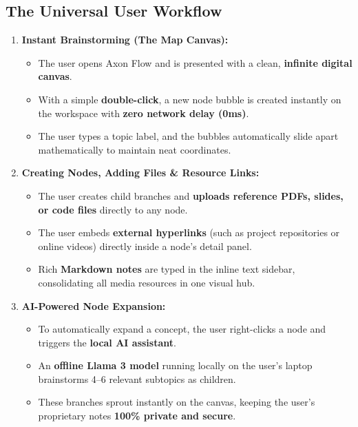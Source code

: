 \documentclass[12pt, a4paper]{article}
\begin{document}
\subsection{The Universal User Workflow}
\begin{enumerate}[leftmargin=*, label=\textbf{\alph*)}]
  \item \textbf{Instant Brainstorming (The Map Canvas):}
    \begin{itemize}[label=\small$\bullet$, leftmargin=15pt]
      \item The user opens Axon Flow and is presented with a clean, \textbf{infinite digital canvas}.
      \item With a simple \textbf{double-click}, a new node bubble is created instantly on the workspace with \textbf{zero network delay (0ms)}.
      \item The user types a topic label, and the bubbles automatically slide apart mathematically to maintain neat coordinates.
    \end{itemize}
    
  \item \textbf{Creating Nodes, Adding Files \& Resource Links:}
    \begin{itemize}[label=\small$\bullet$, leftmargin=15pt]
      \item The user creates child branches and \textbf{uploads reference PDFs, slides, or code files} directly to any node.
      \item The user embeds \textbf{external hyperlinks} (such as project repositories or online videos) directly inside a node's detail panel.
      \item Rich \textbf{Markdown notes} are typed in the inline text sidebar, consolidating all media resources in one visual hub.
    \end{itemize}

  \item \textbf{AI-Powered Node Expansion:}
    \begin{itemize}[label=\small$\bullet$, leftmargin=15pt]
      \item To automatically expand a concept, the user right-clicks a node and triggers the \textbf{local AI assistant}.
      \item An \textbf{offline Llama 3 model} running locally on the user's laptop brainstorms 4--6 relevant subtopics as children.
      \item These branches sprout instantly on the canvas, keeping the user's proprietary notes \textbf{100\% private and secure}.
    \end{itemize}


\end{enumerate}
\end{document}
